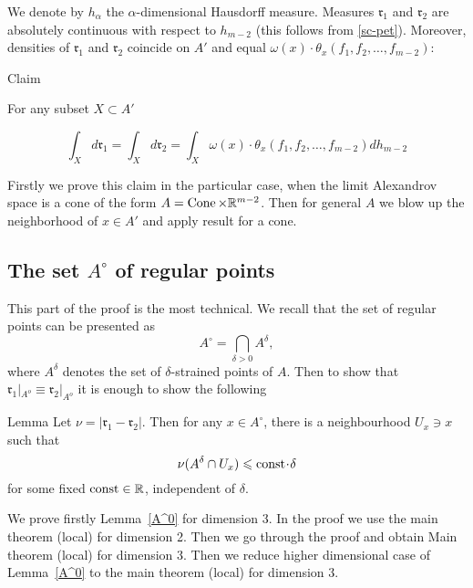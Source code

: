 \documentclass[a4paper,10pt]{article}
\begin{document}
We denote by $h_\alpha$ the $\alpha$-dimensional Hausdorff measure. Measures
$\mathfrak{r}_1$ and
$\mathfrak{r}_2$ are
 absolutely continuous with respect to
 $h_{m-2}$ (this follows from \ref{sc-pet}).
Moreover,
densities of
 $\mathfrak{r}_1$ and
$\mathfrak{r}_2$
coincide on $A'$ and equal 
$ \omega(x)\cdot\theta_x(f_1,f_2,\dots,f_{m-2})$:
\begin{thm}{Claim}\label{A'}
 
For any subset $X\subset A'$
 
 $$\int_Xd\mathfrak{r}_1=\int_Xd\mathfrak{r}_2=\int_X
\omega(x)\cdot\theta_x(f_1,f_2,\dots,f_{m-2}) d h_{m-2} $$
 
  
\end{thm}

Firstly we prove this claim in the particular case, when
the limit Alexandrov space is a cone of the form $A=\operatorname{Cone}\times\mathbb{R}^{m-2}$. Then for general $A$ we blow up the 
neighborhood of  $x\in A'$ and apply result for a cone.

\subsection{The set $A^\circ$  of regular points }\label{sec:A0}
This part of the proof is the most technical.
We recall that the set of regular points can be presented as
$$A^{\circ}=\bigcap_{\delta>0} A^\delta,$$
where $A^\delta$ denotes the set of $\delta$-strained points of $A$.
Then to show that
$\mathfrak{r}_1|_{A^o}\equiv\mathfrak{r}_2|_{A^o}$
it is enough to show the following

\begin{thm}{Lemma}\label{A^0}
Let $\nu=|\mathfrak{r}_1-\mathfrak{r}_2|$.
Then for any $x\in A^\circ$, there is a neighbourhood $U_x\ni x$ such that
$$\nu({A^\delta\cap U_x})\le \const\cdot\delta$$
for some fixed $\mathrm{const}\in\mathbb{R}$, independent of $\delta$.
\end{thm}


We prove firstly Lemma~\ref{A^0} for dimension 3. In the proof
we use the main theorem (local) for dimension 2. 
 Then we go through the proof and obtain Main theorem (local) for dimension 3.
 Then we reduce higher dimensional case of Lemma~\ref{A^0} to 
   the main theorem (local) for dimension 3. 
    
 
 
\end{document}
